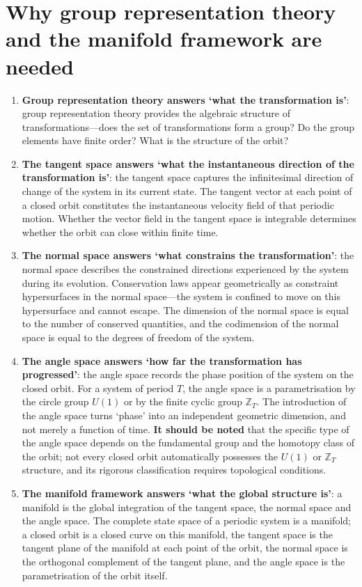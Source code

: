 \section*{Why group representation theory and the manifold framework are needed}

\begin{enumerate}[label=(\roman*)]
    \item \textbf{Group representation theory answers `what the transformation is'}: group representation theory provides the algebraic structure of transformations---does the set of transformations form a group? Do the group elements have finite order? What is the structure of the orbit?
    \item \textbf{The tangent space answers `what the instantaneous direction of the transformation is'}: the tangent space captures the infinitesimal direction of change of the system in its current state. The tangent vector at each point of a closed orbit constitutes the instantaneous velocity field of that periodic motion. Whether the vector field in the tangent space is integrable determines whether the orbit can close within finite time.
    \item \textbf{The normal space answers `what constrains the transformation'}: the normal space describes the constrained directions experienced by the system during its evolution. Conservation laws appear geometrically as constraint hypersurfaces in the normal space---the system is confined to move on this hypersurface and cannot escape. The dimension of the normal space is equal to the number of conserved quantities, and the codimension of the normal space is equal to the degrees of freedom of the system.
    \item \textbf{The angle space answers `how far the transformation has progressed'}: the angle space records the phase position of the system on the closed orbit. For a system of period $T$, the angle space is a parametrisation by the circle group $U(1)$ or by the finite cyclic group $\mathbb{Z}_T$. The introduction of the angle space turns `phase' into an independent geometric dimension, and not merely a function of time. \textbf{It should be noted} that the specific type of the angle space depends on the fundamental group and the homotopy class of the orbit; not every closed orbit automatically possesses the $U(1)$ or $\mathbb{Z}_T$ structure, and its rigorous classification requires topological conditions.
    \item \textbf{The manifold framework answers `what the global structure is'}: a manifold is the global integration of the tangent space, the normal space and the angle space. The complete state space of a periodic system is a manifold; a closed orbit is a closed curve on this manifold, the tangent space is the tangent plane of the manifold at each point of the orbit, the normal space is the orthogonal complement of the tangent plane, and the angle space is the parametrisation of the orbit itself.
\end{enumerate}

